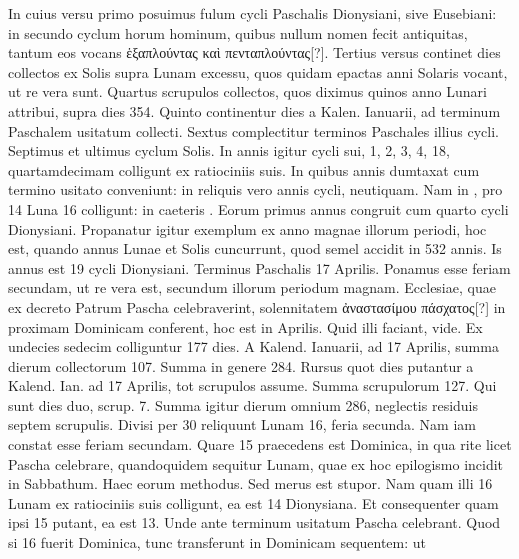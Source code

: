 In cuius versu primo posuimus
fulum cycli Paschalis Dionysiani,
sive Eusebiani: in secundo
cyclum horum hominum,
quibus nullum nomen fecit antiquitas,
tantum eos vocans \textgreek{ἑξαπλούντας
καὶ πενταπλούντας[?]}.
Tertius versus
continet dies collectos ex Solis
supra Lunam excessu, quos
quidam epactas anni Solaris vocant,
ut re vera sunt.
Quartus
scrupulos collectos, quos diximus
quinos anno Lunari attribui, supra dies 354.
Quinto continentur
dies a Kalen. %
 Ianuarii, ad terminum Paschalem usitatum collecti. %
Sextus complectitur terminos Paschales illius cycli.
Septimus et ultimus
cyclum Solis.
In annis igitur cycli sui, 1, 2, 3, 4, 18, quartamdecimam colligunt
ex ratiociniis suis.
In quibus annis dumtaxat cum termino usitato
conveniunt: in reliquis vero annis cycli, neutiquam.
Nam in ,
pro 14 Luna 16 colligunt: in caeteris .
Eorum primus annus congruit
cum quarto cycli Dionysiani.
Propanatur igitur exemplum ex
anno magnae illorum periodi, hoc est, quando annus  Lunae
et Solis cuncurrunt, quod semel accidit in 532 annis.
Is annus 
est 19 cycli Dionysiani.
Terminus Paschalis 17 Aprilis.
Ponamus esse
feriam secundam, ut re vera est, secundum illorum periodum magnam.
%
Ecclesiae, quae ex decreto Patrum Pascha celebraverint,
 solennitatem
\textgreek{ἀναστασίμου πάσχατος[?]} in proximam Dominicam conferent,
hoc est in  Aprilis.
Quid illi faciant, vide.
Ex undecies sedecim
colliguntur 177 dies.
A Kalend. Ianuarii, ad 17 Aprilis, %
summa dierum collectorum 107.
Summa in genere 284.
Rursus
quot dies putantur a Kalend. Ian. ad 17 Aprilis, tot scrupulos assume. %
Summa scrupulorum 127.
Qui sunt dies duo, scrup. 7. %
Summa
igitur dierum omnium 286, neglectis residuis septem scrupulis.
Divisi per 30 reliquunt Lunam 16, feria secunda.
Nam iam constat
esse feriam secundam.
Quare 15 praecedens est Dominica, in qua rite
licet Pascha celebrare, quandoquidem sequitur  Lunam, quae
ex hoc epilogismo incidit in Sabbathum.
Haec eorum methodus.
Sed
merus est stupor.
Nam quam illi 16 Lunam ex ratiociniis suis colligunt,
ea est 14 Dionysiana.
Et consequenter quam ipsi 15 putant,
ea est 13.
Unde ante terminum usitatum Pascha celebrant.
Quod si
16 fuerit Dominica, tunc transferunt in Dominicam sequentem: ut
